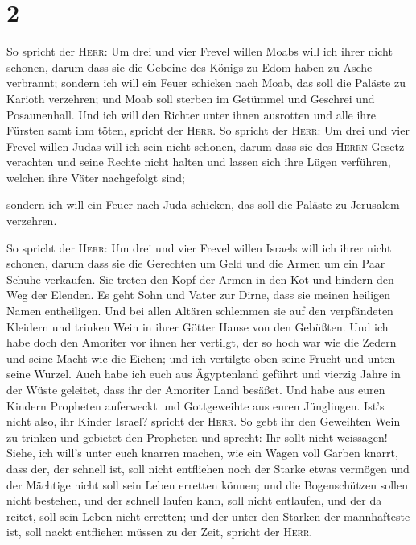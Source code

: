 \hypertarget{section-1}{%
\section{2}\label{section-1}}

 So spricht der \textsc{Herr}: Um drei und vier Frevel
willen Moabs will ich ihrer nicht schonen, darum dass sie die Gebeine
des Königs zu Edom haben zu Asche verbrannt;  sondern ich
will ein Feuer schicken nach Moab, das soll die Paläste zu Karioth
verzehren; und Moab soll sterben im Getümmel und Geschrei und
Posaunenhall.  Und ich will den Richter unter ihnen
ausrotten und alle ihre Fürsten samt ihm töten, spricht der
\textsc{Herr}.  So spricht der \textsc{Herr}: Um drei und
vier Frevel willen Judas will ich sein nicht schonen, darum dass sie des
\textsc{Herrn} Gesetz verachten und seine Rechte nicht halten und lassen
sich ihre Lügen verführen, welchen ihre Väter nachgefolgt sind;

 sondern ich will ein Feuer nach Juda schicken, das soll
die Paläste zu Jerusalem verzehren.

 So spricht der \textsc{Herr}: Um drei und vier Frevel
willen Israels will ich ihrer nicht schonen, darum dass sie die
Gerechten um Geld und die Armen um ein Paar Schuhe verkaufen.
 Sie treten den Kopf der Armen in den Kot und hindern den
Weg der Elenden. Es geht Sohn und Vater zur Dirne, dass sie meinen
heiligen Namen entheiligen.  Und bei allen Altären
schlemmen sie auf den verpfändeten Kleidern und trinken Wein in ihrer
Götter Hause von den Gebüßten.  Und ich habe doch den
Amoriter vor ihnen her vertilgt, der so hoch war wie die Zedern und
seine Macht wie die Eichen; und ich vertilgte oben seine Frucht und
unten seine Wurzel.  Auch habe ich euch aus Ägyptenland
geführt und vierzig Jahre in der Wüste geleitet, dass ihr der Amoriter
Land besäßet.  Und habe aus euren Kindern Propheten
auferweckt und Gottgeweihte aus euren Jünglingen. Ist's nicht also, ihr
Kinder Israel? spricht der \textsc{Herr}.  So gebt ihr
den Geweihten Wein zu trinken und gebietet den Propheten und sprecht:
Ihr sollt nicht weissagen!  Siehe, ich will's unter euch
knarren machen, wie ein Wagen voll Garben knarrt,  dass
der, der schnell ist, soll nicht entfliehen noch der Starke etwas
vermögen und der Mächtige nicht soll sein Leben erretten können;
 und die Bogenschützen sollen nicht bestehen, und der
schnell laufen kann, soll nicht entlaufen, und der da reitet, soll sein
Leben nicht erretten;  und der unter den Starken der
mannhafteste ist, soll nackt entfliehen müssen zu der Zeit, spricht der
\textsc{Herr}.

